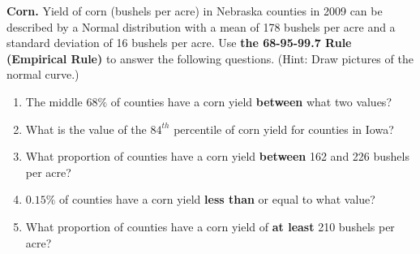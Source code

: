 
\item \textbf{Corn.} Yield of corn (bushels per acre) in Nebraska counties in 2009 can be described by a Normal distribution with a mean of 178 bushels per acre and a standard deviation of 16 bushels per acre. Use \textbf{the 68-95-99.7 Rule (Empirical Rule)} to answer the following questions. (Hint: Draw pictures of the normal curve.)
\begin{enumerate}
\item The middle $68\%$ of counties have a corn yield \textbf{between} what two values?
\item What is the value of the $84^{th}$ percentile of corn yield for counties in Iowa?  
\item What proportion of counties have a corn yield \textbf{between} 162 and 226 bushels per acre?
\item $0.15\%$ of counties have a corn yield \textbf{less than} or equal to what value?
\item  What proportion of counties have a corn yield of \textbf{at least} 210 bushels per acre?
\end{enumerate}
